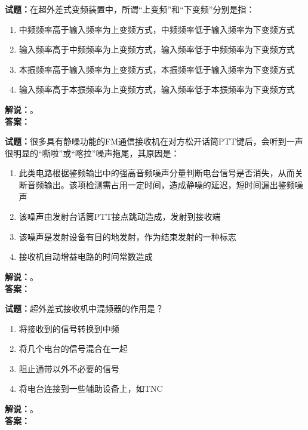 \documentclass{ctexbook}
\begin{document}
\noindent\textbf{试题：}在超外差式变频装置中，所谓“上变频”和“下变频”分别是指：
\begin{enumerate}[leftmargin=3em]
  \item 中频频率高于输入频率为上变频方式，中频频率低于输入频率为下变频方式
  \item 输入频率高于中频频率为上变频方式，输入频率低于中频频率为下变频方式
  \item 本振频率高于输入频率为上变频方式，本振频率低于输入频率为下变频方式
  \item 输入频率高于本振频率为上变频方式，输入频率低于本振频率为下变频方式
\end{enumerate}
\noindent\textbf{解说：}\textbf{}。\\\noindent\textbf{答案：}

\vspace{\baselineskip}

\noindent\textbf{试题：}很多具有静噪功能的FM通信接收机在对方松开话筒PTT键后，会听到一声很明显的“嘶啦”或“喀拉”噪声拖尾，其原因是：
\begin{enumerate}[leftmargin=3em]
  \item 此类电路根据鉴频输出中的强高音频噪声分量判断电台信号是否消失，从而关断音频输出。该项检测需占用一定时间，造成静噪的延迟，短时间漏出鉴频噪声
  \item 该噪声由发射台话筒PTT接点跳动造成，发射到接收端
  \item 该噪声是发射设备有目的地发射，作为结束发射的一种标志
  \item 接收机自动增益电路的时间常数造成
\end{enumerate}
\noindent\textbf{解说：}\textbf{}。\\\noindent\textbf{答案：}

\vspace{\baselineskip}

\noindent\textbf{试题：}超外差式接收机中混频器的作用是？
\begin{enumerate}[leftmargin=3em]
  \item 将接收到的信号转换到中频
  \item 将几个电台的信号混合在一起
  \item 阻止通带以外不必要的信号
  \item 将电台连接到一些辅助设备上，如TNC
\end{enumerate}
\noindent\textbf{解说：}\textbf{}。\\\noindent\textbf{答案：}

\vspace{\baselineskip}
\end{document}
